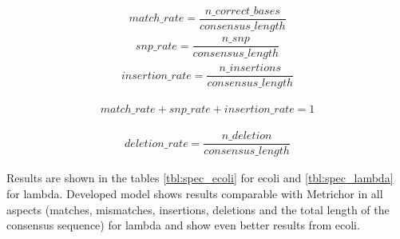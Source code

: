 \documentclass[times, utf8, diplomski, numeric, english]{fer}
\begin{document}
\begin{equation}
\begin{gathered}
match\_rate = \dfrac{n\_correct\_bases}{consensus\_length}
\end{gathered}
\end{equation}
\begin{equation}
\begin{gathered}
snp\_rate = \dfrac{n\_snp}{consensus\_length}
\end{gathered}
\end{equation}
\begin{equation}
\begin{gathered}
insertion\_rate = \dfrac{n\_insertions}{consensus\_length}
\end{gathered}
\end{equation}

\begin{equation}
\begin{gathered}
match\_rate  + snp\_rate + insertion\_rate = 1
\end{gathered}
\end{equation}


\begin{equation}
\begin{gathered}
deletion\_rate = \dfrac{n\_deletion}{consensus\_length}
\end{gathered}
\end{equation}

Results are shown in the tables \ref{tbl:spec_ecoli}  for ecoli and \ref{tbl:spec_lambda} for lambda. 
Developed model shows results comparable with Metrichor in all aspects (matches, mismatches, insertions, deletions and the total length of the consensus sequence) for lambda and show even better results from ecoli. 
\end{document}
